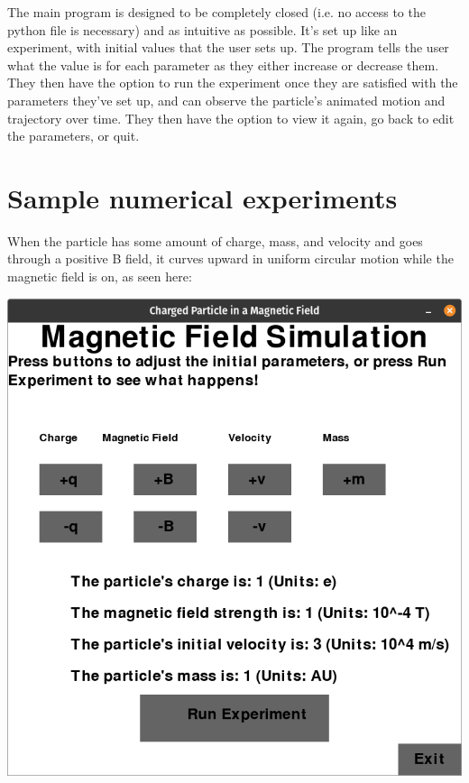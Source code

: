 \documentclass[11pt]{article}
\begin{document}
   	    	The main program is designed to be completely closed (i.e. no access to the python file is necessary) and as intuitive as possible. It's set up like an experiment, with initial values that the user sets up. The program tells the user what the value is for each parameter as they either increase or decrease them. They then have the option to run the experiment once they are satisfied with the parameters they've set up, and can observe the particle's animated motion and trajectory over time. They then have the option to view it again, go back to edit the parameters, or quit.
   	    	
   		\section*{Sample numerical experiments}
   		
   			When the particle has some amount of charge, mass, and velocity and goes through a positive B field, it curves upward in uniform circular motion while the magnetic field is on, as seen here:
   			
   			\includegraphics[scale=0.3]{1}
   			
\end{document}
